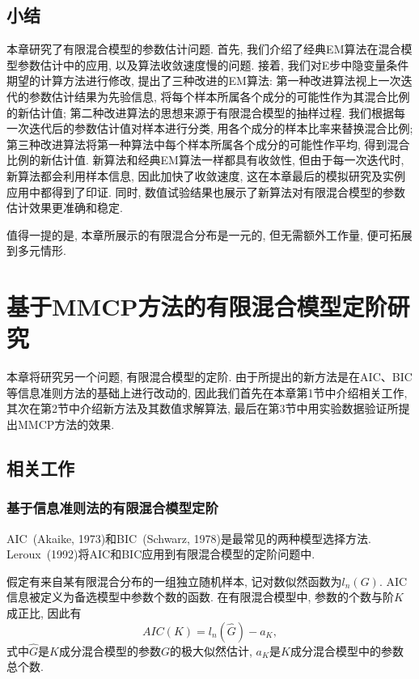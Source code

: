 \documentclass[a4paper,12pt,openany,oneside,utf-8]{ctexbook}
\begin{document}
\section{小结}
本章研究了有限混合模型的参数估计问题. 首先, 我们介绍了经典EM算法在混合模型参数估计中的应用, 以及算法收敛速度慢的问题. 接着, 我们对E步中隐变量条件期望的计算方法进行修改, 提出了三种改进的EM算法: 第一种改进算法视上一次迭代的参数估计结果为先验信息, 将每个样本所属各个成分的可能性作为其混合比例的新估计值; 第二种改进算法的思想来源于有限混合模型的抽样过程. 我们根据每一次迭代后的参数估计值对样本进行分类, 用各个成分的样本比率来替换混合比例; 第三种改进算法将第一种算法中每个样本所属各个成分的可能性作平均, 得到混合比例的新估计值. 新算法和经典EM算法一样都具有收敛性, 但由于每一次迭代时, 新算法都会利用样本信息, 因此加快了收敛速度, 这在本章最后的模拟研究及实例应用中都得到了印证. 同时, 数值试验结果也展示了新算法对有限混合模型的参数估计效果更准确和稳定.

值得一提的是, 本章所展示的有限混合分布是一元的, 但无需额外工作量, 便可拓展到多元情形.

\chapter[基于MMCP方法的有限混合模型定阶研究]{基于MMCP方法的有限混合模型定阶研究}
本章将研究另一个问题, 有限混合模型的定阶. 由于所提出的新方法是在AIC、BIC等信息准则方法的基础上进行改动的, 因此我们首先在本章第1节中介绍相关工作, 其次在第2节中介绍新方法及其数值求解算法, 最后在第3节中用实验数据验证所提出MMCP方法的效果.

\section{相关工作}
\label{sec:related work on order selection}
\subsection{基于信息准则法的有限混合模型定阶}
AIC~(Akaike, 1973)和BIC~(Schwarz, 1978)是最常见的两种模型选择方法. Leroux~(1992)将AIC和BIC应用到有限混合模型的定阶问题中.

假定有来自某有限混合分布的一组独立随机样本, 记对数似然函数为$l_{n}(G)$. AIC信息被定义为备选模型中参数个数的函数. 在有限混合模型中, 参数的个数与阶$K$成正比, 因此有
\begin{equation*}
  AIC(K)=l_{n}(\hat{G})-a_K,
\end{equation*}
式中$\hat{G}$是$K$成分混合模型的参数$G$的极大似然估计, $a_K$是$K$成分混合模型中的参数总个数.
\end{document}
